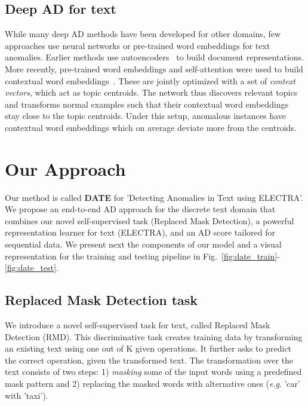 \documentclass[11pt]{article}
\newcommand{\eg}{\textit{e}.\textit{g}. }
\begin{document}
\subsection{Deep AD for text}
While many deep AD methods have been developed for other domains, few approaches use neural networks or pre-trained word embeddings for text anomalies. Earlier methods use autoencoders~\cite{Manevitz2007} to build document representations. More recently, pre-trained word embeddings and self-attention were used to build contextual word embeddings~\cite{acl2019}. These are jointly optimized with a set of \emph{context vectors}, which act as topic centroids. The network thus discovers relevant topics and transforms normal examples such that their contextual word embeddings stay close to the topic centroids. Under this setup, anomalous instances have contextual word embeddings which on average deviate more from the centroids.

\section{Our Approach}
Our method is called \textbf{DATE} for 'Detecting Anomalies in Text using ELECTRA'. We propose an end-to-end AD approach for the discrete text domain that combines our novel self-supervised task (Replaced Mask Detection), a powerful representation learner for text (ELECTRA), and an AD score tailored for sequential data. We present next the components of our model and a visual representation for the training and testing pipeline in Fig.~\ref{fig:date_train}-\ref{fig:date_test}.


\subsection{Replaced Mask Detection task}
We introduce a novel self-supervised task for text, called Replaced Mask Detection (RMD). This discriminative task creates training data by transforming an existing text using one out of K given operations. It further asks to predict the correct operation, given the transformed text. The transformation over the text consists of two steps: 1) \emph{masking} some of the input words using a predefined mask pattern and 2) replacing the masked words with alternative ones (\eg 'car' with 'taxi').
\end{document}
